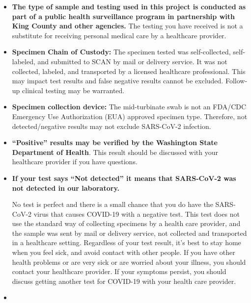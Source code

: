 \documentclass[10pt]{article}
\begin{document}
\begin{itemize}
\item

  \textbf{The type of sample and testing used in this project is
  conducted as part of a public health surveillance program in
  partnership with King County and other agencies.} The testing you have
  received is not a substitute for receiving personal medical care by a
  healthcare provider.

\item

  \textbf{Specimen Chain of Custody:} The specimen tested was
  self-collected, self-labeled, and submitted to SCAN by mail or
  delivery service. It was not collected, labeled, and transported by a
  licensed healthcare professional. This may impact test results and
  false negative results cannot be excluded. Follow-up clinical testing
  may be warranted.

\item

  \textbf{Specimen collection device:} The mid-turbinate swab is not an
  FDA/CDC Emergency Use Authorization (EUA) approved specimen type.
  Therefore, not detected/negative results may not exclude SARS-CoV-2
  infection.

\item

  \textbf{``Positive'' results may be verified by the Washington State
  Department of Health}. This result should be discussed with your
  healthcare provider if you have questions.

\item{
  \textbf{If your test says ``Not detected'' it means that SARS-CoV-2
    was not detected in our laboratory.}

  No test is perfect and there is a small chance that you do have the
  SARS-CoV-2 virus that causes COVID-19 with a negative test. This test
  does not use the standard way of collecting specimens by a health care
  provider, and the sample was sent by mail or delivery service, not collected and transported
  in a healthcare setting. Regardless of your test result, it's best to
  stay home when you feel sick, and avoid contact with other people. If
  you have other health problems or are very sick or are worried about
  your illness, you should contact your healthcare provider. If your
  symptoms persist, you should discuss getting another test for COVID-19
  with your health care provider.
}

\item


\end{itemize}
\end{document}
